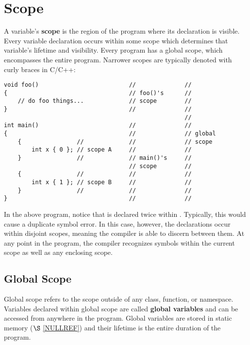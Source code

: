 \section{Scope}

\noindent
A variable's \textbf{scope} is the region of the program where its declaration is visible.
Every variable declaration occurs within some scope which determines that variable's lifetime and visibility.
Every program has a global scope, which encompasses the entire program.
Narrower scopes are typically denoted with curly braces \inlinecxx{\{\}} in C/C++:

\begin{lstlisting}[style=cxx]
void foo()                          //              //
{                                   // foo()'s      //
    // do foo things...             // scope        //
}                                   //              //
                                                    //
int main()                          //              //
{                                   //              // global
    {                //             //              // scope
        int x { 0 }; // scope A     //              //
    }                //             // main()'s     //
                                    // scope        //
    {                //             //              //
        int x { 1 }; // scope B     //              //
    }                //             //              //
}                                   //              //
\end{lstlisting}

\noindent
In the above program, notice that  is declared twice within .
Typically, this would cause a duplicate symbol error.
In this case, however, the declarations occur within disjoint scopes, meaning the compiler is able to discern between them.
At any point in the program, the compiler recognizes symbols within the current scope as well as any enclosing scope.

\subsection{Global Scope}

\noindent
Global scope refers to the scope outside of any class, function, or namespace.
Variables declared within global scope are called \textbf{global variables} and can be accessed from anywhere in the program.
Global variables are stored in static memory ($\S$ \ref{NULLREF}) and their lifetime is the entire duration of the program.

